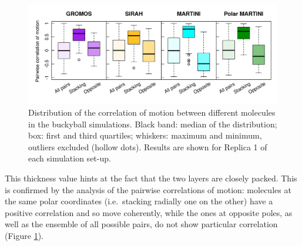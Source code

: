 \begin{figure}[t]
\centering
\includegraphics[width=0.95\linewidth]{3results_capsule/pics/RKGBcorr_boxplot_all.png} 
\caption[Correlation of motion between molecules of the buckyball]{Distribution of the correlation of motion between different molecules in the buckyball simulations. Black band: median of the distribution; box: first and third quartiles; whiskers: maximum and minimum, outliers excluded (hollow dots). Results are shown for Replica 1 of each simulation set-up.}
\label{fig:BTI_corr}
\end{figure}
%
This thickness value hints at the fact that the two layers are closely packed. This is confirmed by the analysis of the pairwise correlations of motion:
%
molecules at the same polar coordinates (i.e.\ stacking radially one on the other) have a positive correlation and so move coherently, while the ones at opposite poles, as well as the ensemble of all possible pairs, do not show particular correlation (Figure \ref{fig:BTI_corr}). 


